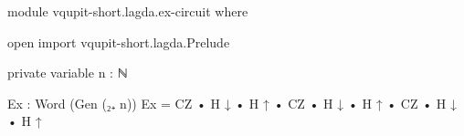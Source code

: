 \begin{code}[hide]
module vqupit-short.lagda.ex-circuit where

open import vqupit-short.lagda.Prelude

private variable
  n : ℕ
\end{code}
\begin{code}
Ex : Word (Gen (₂₊ n))
Ex = CZ • H ↓ • H ↑ • CZ • H ↓ • H ↑ • CZ • H ↓ • H ↑
\end{code}
